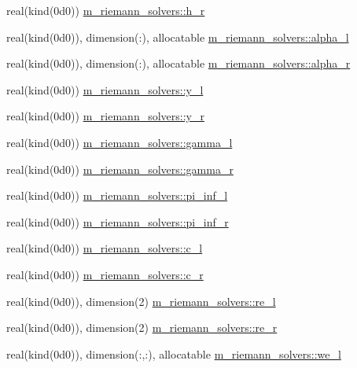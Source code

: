 \begin{Indent}
\begin{DoxyCompactItemize}
\item 
real(kind(0d0)) \hyperlink{namespacem__riemann__solvers_ac585ca9198161cf6d9130b696a2f1196}{m\+\_\+riemann\+\_\+solvers\+::h\+\_\+r}
\item 
real(kind(0d0)), dimension(\+:), allocatable \hyperlink{namespacem__riemann__solvers_a485dc456f00eaa35c862ca3a2daa3d8c}{m\+\_\+riemann\+\_\+solvers\+::alpha\+\_\+l}
\item 
real(kind(0d0)), dimension(\+:), allocatable \hyperlink{namespacem__riemann__solvers_abdd33525dd128beda2d0c33454e0d9de}{m\+\_\+riemann\+\_\+solvers\+::alpha\+\_\+r}
\item 
real(kind(0d0)) \hyperlink{namespacem__riemann__solvers_ad79d372c1bc1971b870ab2c455d9ff90}{m\+\_\+riemann\+\_\+solvers\+::y\+\_\+l}
\item 
real(kind(0d0)) \hyperlink{namespacem__riemann__solvers_aef2c7eeabded0734aaa0cd95adac91ab}{m\+\_\+riemann\+\_\+solvers\+::y\+\_\+r}
\item 
real(kind(0d0)) \hyperlink{namespacem__riemann__solvers_a8159569b322091efa55bbeb377532352}{m\+\_\+riemann\+\_\+solvers\+::gamma\+\_\+l}
\item 
real(kind(0d0)) \hyperlink{namespacem__riemann__solvers_ac422e0817e2011364cc6fc9c9a56b82b}{m\+\_\+riemann\+\_\+solvers\+::gamma\+\_\+r}
\item 
real(kind(0d0)) \hyperlink{namespacem__riemann__solvers_ac90ee6bf146aa47944bb11cd5de0a580}{m\+\_\+riemann\+\_\+solvers\+::pi\+\_\+inf\+\_\+l}
\item 
real(kind(0d0)) \hyperlink{namespacem__riemann__solvers_a925187e709792a5fcfa80daebd568e8f}{m\+\_\+riemann\+\_\+solvers\+::pi\+\_\+inf\+\_\+r}
\item 
real(kind(0d0)) \hyperlink{namespacem__riemann__solvers_a9c1dab7bfde55cdc6f738752c077f08a}{m\+\_\+riemann\+\_\+solvers\+::c\+\_\+l}
\item 
real(kind(0d0)) \hyperlink{namespacem__riemann__solvers_a9393a8d17da2a98f5061804baca0349d}{m\+\_\+riemann\+\_\+solvers\+::c\+\_\+r}
\item 
real(kind(0d0)), dimension(2) \hyperlink{namespacem__riemann__solvers_a2a804f5759af46c82fdd62633b5e7605}{m\+\_\+riemann\+\_\+solvers\+::re\+\_\+l}
\item 
real(kind(0d0)), dimension(2) \hyperlink{namespacem__riemann__solvers_a31045aff8e978fd620943eaed4fbb973}{m\+\_\+riemann\+\_\+solvers\+::re\+\_\+r}
\item 
real(kind(0d0)), dimension(\+:,\+:), allocatable \hyperlink{namespacem__riemann__solvers_a953a81975cc1627c87baca12ed51ed95}{m\+\_\+riemann\+\_\+solvers\+::we\+\_\+l}

\end{DoxyCompactItemize}
\end{Indent}
